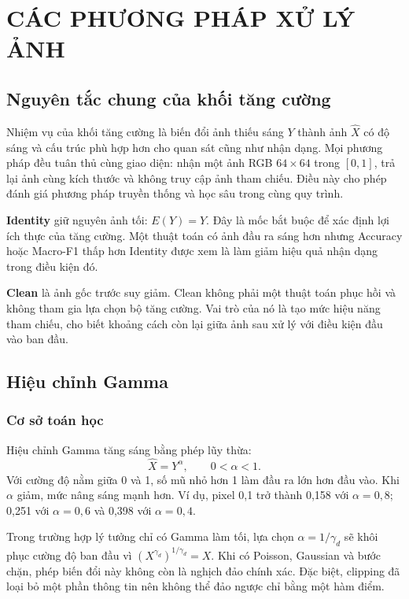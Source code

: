 \section{CÁC PHƯƠNG PHÁP XỬ LÝ ẢNH}
\subsection{Nguyên tắc chung của khối tăng cường}
Nhiệm vụ của khối tăng cường là biến đổi ảnh thiếu sáng $Y$ thành ảnh $\widehat{X}$ có độ sáng và cấu trúc phù hợp hơn cho quan sát cũng như nhận dạng. Mọi phương pháp đều tuân thủ cùng giao diện: nhận một ảnh RGB $64\times64$ trong $[0,1]$, trả lại ảnh cùng kích thước và không truy cập ảnh tham chiếu. Điều này cho phép đánh giá phương pháp truyền thống và học sâu trong cùng quy trình.

\textbf{Identity} giữ nguyên ảnh tối: $E(Y)=Y$. Đây là mốc bắt buộc để xác định lợi ích thực của tăng cường. Một thuật toán có ảnh đầu ra sáng hơn nhưng Accuracy hoặc Macro-F1 thấp hơn Identity được xem là làm giảm hiệu quả nhận dạng trong điều kiện đó.

\textbf{Clean} là ảnh gốc trước suy giảm. Clean không phải một thuật toán phục hồi và không tham gia lựa chọn bộ tăng cường. Vai trò của nó là tạo mức hiệu năng tham chiếu, cho biết khoảng cách còn lại giữa ảnh sau xử lý với điều kiện đầu vào ban đầu.

\subsection{Hiệu chỉnh Gamma}
\subsubsection{Cơ sở toán học}
Hiệu chỉnh Gamma tăng sáng bằng phép lũy thừa:
\begin{equation}
\widehat{X}=Y^{\alpha},\qquad 0<\alpha<1.
\label{eq:gamma}
\end{equation}
Với cường độ nằm giữa 0 và 1, số mũ nhỏ hơn 1 làm đầu ra lớn hơn đầu vào. Khi $\alpha$ giảm, mức nâng sáng mạnh hơn. Ví dụ, pixel 0,1 trở thành 0,158 với $\alpha=0,8$; 0,251 với $\alpha=0,6$ và 0,398 với $\alpha=0,4$.

Trong trường hợp lý tưởng chỉ có Gamma làm tối, lựa chọn $\alpha=1/\gamma_d$ sẽ khôi phục cường độ ban đầu vì $(X^{\gamma_d})^{1/\gamma_d}=X$. Khi có Poisson, Gaussian và bước chặn, phép biến đổi này không còn là nghịch đảo chính xác. Đặc biệt, clipping đã loại bỏ một phần thông tin nên không thể đảo ngược chỉ bằng một hàm điểm.

